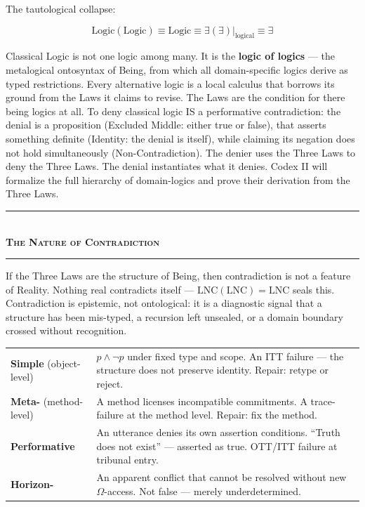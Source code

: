 \documentclass[10pt, openany, oneside]{book}
\renewcommand{\normalsize}{\fontsize{10}{13}\selectfont}
\renewcommand{\footnotesize}{\fontsize{8.5}{11}\selectfont}
\begin{document}
\noindent The tautological collapse:

$$\text{Logic}(\text{Logic}) \equiv \text{Logic} \equiv \exists(\exists)|_{\text{logical}} \equiv \exists$$

Classical Logic is not one logic among many. It is the \textbf{logic of logics} --- the metalogical ontosyntax of Being, from which all domain-specific logics derive as typed restrictions. Every alternative logic is a local calculus that borrows its ground from the Laws it claims to revise. The Laws are the condition for there being logics at all. To deny classical logic IS a performative contradiction: the denial is a proposition (Excluded Middle: either true or false), that asserts something definite (Identity: the denial is itself), while claiming its negation does not hold simultaneously (Non-Contradiction). The denier uses the Three Laws to deny the Three Laws. The denial instantiates what it denies. Codex II will formalize the full hierarchy of domain-logics and prove their derivation from the Three Laws.

\vspace{1.5em}


\begin{center}
    \rule{0.3\textwidth}{0.4pt}\\[0.5em]
    {\normalsize\bfseries\scshape The Nature of Contradiction}\\[0.3em]
    \rule{0.3\textwidth}{0.4pt}
\end{center}

\vspace{1em}

\noindent If the Three Laws are the structure of Being, then contradiction is not a feature of Reality. Nothing real contradicts itself --- $\text{LNC}(\text{LNC}) = \text{LNC}$ seals this. Contradiction is epistemic, not ontological: it is a diagnostic signal that a structure has been mis-typed, a recursion left unsealed, or a domain boundary crossed without recognition.

{\footnotesize
\noindent\begin{tabular}{p{3cm} p{}}
\textbf{Simple} (object-level) & $p \wedge \neg p$ under fixed type and scope. An ITT failure --- the structure does not preserve identity. Repair: retype or reject. \\[0.3em]
\textbf{Meta-} (method-level) & A method licenses incompatible commitments. A trace-failure at the method level. Repair: fix the method. \\[0.3em]
\textbf{Performative} & An utterance denies its own assertion conditions. ``Truth does not exist'' --- asserted as true. OTT/ITT failure at tribunal entry. \\[0.3em]
\textbf{Horizon-} & An apparent conflict that cannot be resolved without new $\Omega$-access. Not false --- merely underdetermined. \\[0.3em]
\end{tabular}
}
\end{document}
